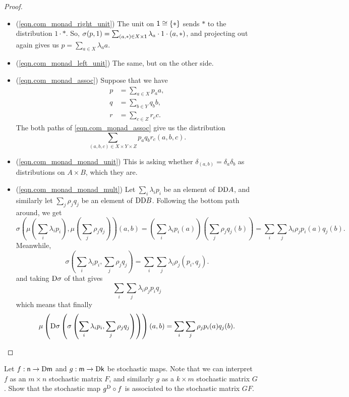 \documentclass[DynamicalBook]{subfiles}
\begin{document}
\begin{proof}
  \begin{itemize}
\item (\cref{eqn.com_monad_right_unit}) The unit on $\mathsf{1} \cong \{\ast\}$
  sends $\ast$ to the distribution $1 \cdot \ast$. So, $\sigma(p, 1) = \sum_{(a, \ast) \in X \times
    \mathsf{1}} \lambda_a \cdot 1 \cdot (a, \ast)$, and projecting out again gives
  us $p = \sum_{a \in X} \lambda_a a$.
\item (\cref{eqn.com_monad_left_unit}) The same, but on the other side.
\item (\cref{eqn.com_monad_assoc}) Suppose that we have
  \begin{align*}
    p &= \sum_{a \in X} p_a a, \\
    q &= \sum_{b \in Y} q_b b, \\
    r &= \sum_{c \in Z} r_c c.
  \end{align*}
  The both paths of \cref{eqn.com_monad_assoc} give us the distribution
  \[
\sum_{(a, b, c) \in X \times Y \times Z} p_a q_b r_c (a, b, c).
  \]
  \item (\cref{eqn.com_monad_monad_unit}) This is asking whether $\delta_{(a,
      b)} = \delta_a \delta_b$ as distributions on $A \times B$, which they are.
  \item (\cref{eqn.com_monad_monad_mult}) Let $\sum_{i} \lambda_i p_i$ be an
    element of $\mathrm{D}\mathrm{D} A$, and similarly let $\sum_j \rho_j q_j$ be an
    element of $\mathrm{D}\mathrm{D} B$. Following the bottom path around, we get
    \[
\sigma\left( \mu\left( \sum_i \lambda_i p_i \right), \mu\left( \sum_j \rho_j q_j
  \right) \right)(a, b) = \left( \sum_i \lambda_i p_i(a) \right)\left( \sum_j
  \rho_j q_j(b) \right) = \sum_i \sum_j \lambda_i \rho_j p_i(a)q_j(b).
    \]
    Meanwhile,
    \[\sigma\left( \sum_i \lambda_i p_i, \sum_j \rho_j q_j \right) =
      \sum_i \sum_j \lambda_i \rho_j (p_i, q_j).
    \]
    and taking $\mathrm{D} \sigma$ of that gives
    \[
\sum_i \sum_j \lambda_i \rho_j p_i q_j
\]
which means that finally
\[
\mu\left(\mathrm{D} \sigma\left( \sigma\left( \sum_i \lambda_i p_i, \sum_j \rho_j
      q_j \right) \right) \right)(a, b) = \sum_i \sum_j \rho_j p_i(a)q_j(b).
\]
  \end{itemize}

\end{proof}

\begin{exercise}
  Let $f : \mathsf{n} \to \mathrm{D} \mathsf{m}$ and $g : \mathsf{m} \to \mathrm{D} \mathsf{k}$
  be stochastic maps. Note that we can interpret $f$ as an $m \times n$
  stochastic matrix $F$, and similarly $g$ as a $k \times m$ stochastic matrix $G$. Show
  that the stochastic map $g^{\mathrm{D}} \circ f$ is associated to the stochastic
  matrix $GF$.
\end{exercise}
\end{document}
